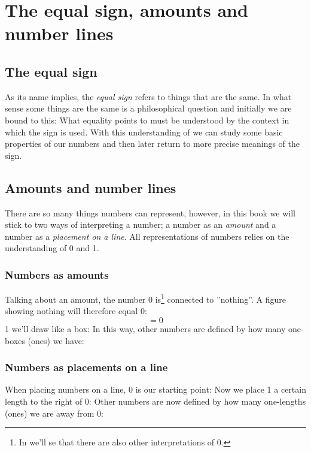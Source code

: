 



\newpage
\section{The equal sign, amounts and number lines}
\subsection*{The equal sign}
As its name implies, the \textit{equal sign}  \sym{$ = $} refers to things that are the same. In what sense some things are the same is a philosophical question and initially we are bound to this: What equality \sym{$=$} points to must be understood by the context in which the sign is used. With this understanding of \sym{=} we can study some basic properties of our numbers and then later return to more precise meanings of the sign. \regv
{}
\subsection*{Amounts and number lines}
There are so many things numbers can represent, however, in this book we will stick to two ways of interpreting a number; a number as an \textsl{amount} and a number as a \textsl{placement on a line}. All representations of numbers relies on the understanding of 0 and 1.

\subsubsection*{Numbers as amounts}
	Talking about an amount, the number 0 is\footnote{In  we'll se that there are also other interpretations of 0.} connected to ''nothing''. A figure showing nothing will therefore equal 0:
	\[ =0 \]
	1 we'll draw like a box:
In this way, other numbers are defined by how many one-boxes (ones) we have:
\newpage	
\subsubsection*{Numbers as placements on a line}
	When placing numbers on a line, 0 is our starting point:
	Now we place 1 a certain length to the right of 0:
	Other numbers are now defined by how many one-lengths (ones) we are away from 0:
